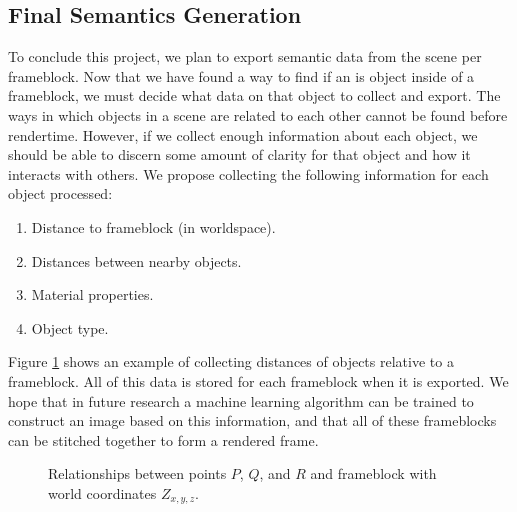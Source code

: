 \documentclass[conference]{IEEEtran}
\begin{document}
\subsection{Final Semantics Generation}
To conclude this project, we plan to export semantic data from the scene per frameblock.
Now that we have found a way to find if an is object inside of a frameblock,
we must decide what data on that object to collect and export.
The ways in which objects in a scene are related to each other cannot be found before rendertime.
However, if we collect enough information about each object, we should be able to discern some amount of clarity
for that object and how it interacts with others.
We propose collecting the following information for each object processed:
\bigskip
\begin{enumerate}
\item Distance to frameblock (in worldspace).
\item Distances between nearby objects.
\item Material properties.
\item Object type.
\end{enumerate}
\bigskip
Figure \ref{fig:distances} shows an example of collecting distances of objects relative to a frameblock.
All of this data is stored for each frameblock when it is exported.
We hope that in future research a machine learning algorithm can be trained to construct an image based on this information,
and that all of these frameblocks can be stitched together to form a rendered frame.

\begin{adjustwidth}{2.5em}{0pt}
\begin{figure}[h!]
\begin{center}
\end{center}
\caption{Relationships between points $P$, $Q$, and $R$ and frameblock with world coordinates $Z_{x,y,z}$.}
\label{fig:distances}
\end{figure}
\end{adjustwidth}
\end{document}
